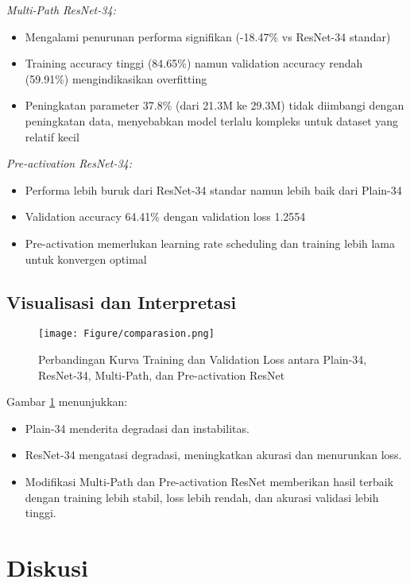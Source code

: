 \documentclass[11pt,a4paper]{article}
\begin{document}
\textit{Multi-Path ResNet-34:}
\begin{itemize}
    \item Mengalami penurunan performa signifikan (-18.47\% vs ResNet-34 standar)
    \item Training accuracy tinggi (84.65\%) namun validation accuracy rendah (59.91\%) mengindikasikan overfitting
    \item Peningkatan parameter 37.8\% (dari 21.3M ke 29.3M) tidak diimbangi dengan peningkatan data, menyebabkan model terlalu kompleks untuk dataset yang relatif kecil
\end{itemize}

\textit{Pre-activation ResNet-34:}
\begin{itemize}
    \item Performa lebih buruk dari ResNet-34 standar namun lebih baik dari Plain-34
    \item Validation accuracy 64.41\% dengan validation loss 1.2554
    \item Pre-activation memerlukan learning rate scheduling dan training lebih lama untuk konvergen optimal
\end{itemize}

\subsection{Visualisasi dan Interpretasi}
\begin{figure}[h]
    \centering
    \texttt{[image: Figure/comparasion.png]}
    \caption{Perbandingan Kurva Training dan Validation Loss antara Plain-34, ResNet-34, Multi-Path, dan Pre-activation ResNet}
    \label{fig:kurva_training}
\end{figure}

Gambar \ref{fig:kurva_training} menunjukkan:
\begin{itemize}
    \item Plain-34 menderita degradasi dan instabilitas.
    \item ResNet-34 mengatasi degradasi, meningkatkan akurasi dan menurunkan loss.
    \item Modifikasi Multi-Path dan Pre-activation ResNet memberikan hasil terbaik dengan training lebih stabil, loss lebih rendah, dan akurasi validasi lebih tinggi.
\end{itemize}

\section{Diskusi}
\end{document}
